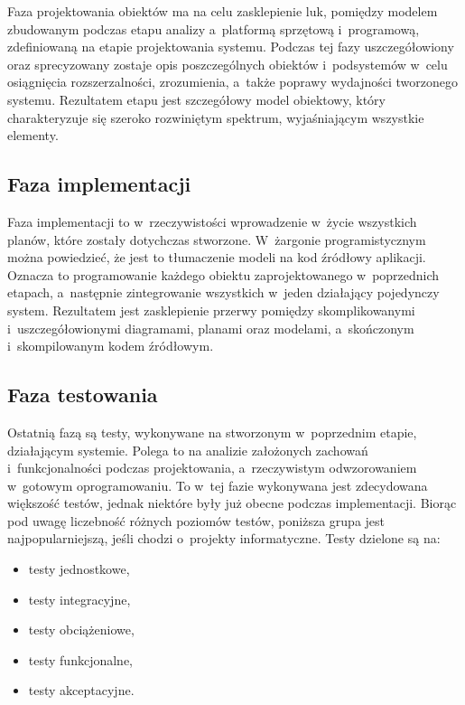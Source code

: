 \documentclass[oneside,polski,logo]{amuthesis}
\begin{document}
Faza projektowania obiektów ma na celu zasklepienie luk, pomiędzy modelem zbudowanym podczas etapu analizy a~platformą sprzętową i~programową, zdefiniowaną na etapie projektowania systemu. Podczas tej fazy uszczegółowiony oraz sprecyzowany zostaje opis poszczególnych obiektów i~podsystemów w~celu osiągnięcia rozszerzalności, zrozumienia, a~także poprawy wydajności tworzonego systemu. Rezultatem etapu jest szczegółowy model obiektowy, który charakteryzuje się szeroko rozwiniętym spektrum, wyjaśniającym wszystkie elementy.

\subsection {Faza implementacji}
Faza implementacji to w~rzeczywistości wprowadzenie w~życie wszystkich planów, które zostały dotychczas stworzone. W~żargonie programistycznym można powiedzieć, że jest to tłumaczenie modeli na kod źródłowy aplikacji. Oznacza to programowanie każdego obiektu zaprojektowanego w~poprzednich etapach, a~następnie zintegrowanie wszystkich w~jeden działający pojedynczy system. Rezultatem jest zasklepienie przerwy pomiędzy skomplikowanymi i~uszczegółowionymi diagramami, planami oraz modelami, a~skończonym i~skompilowanym kodem źródłowym.

\subsection {Faza testowania}
Ostatnią fazą są testy, wykonywane na stworzonym w~poprzednim etapie, działającym systemie. Polega to na analizie założonych zachowań i~funkcjonalności podczas projektowania, a~rzeczywistym odwzorowaniem w~gotowym oprogramowaniu. To w~tej fazie wykonywana jest zdecydowana większość testów, jednak niektóre były już obecne podczas implementacji. Biorąc pod uwagę liczebność różnych poziomów testów, poniższa grupa jest najpopularniejszą, jeśli chodzi o~projekty informatyczne. Testy dzielone są na:

\begin{itemize}
	\item testy jednostkowe,
	\item testy integracyjne,
	\item testy obciążeniowe,
	\item testy funkcjonalne,
	\item testy akceptacyjne.
\end{itemize}
\end{document}
